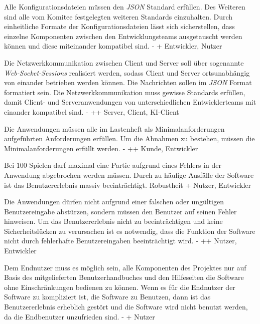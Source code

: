        {Alle Konfigurationsdateien müssen den \textit{JSON} Standard erfüllen. Des Weiteren sind alle vom Komitee festgelegten weiteren Standards einzuhalten.}
        {Durch einheitliche Formate der Konfigurationsdateien lässt sich sicherstellen, dass einzelne Komponenten zwischen den Entwicklungsteams ausgetauscht werden können und diese miteinander kompatibel sind. }
        {-}
        {+}
        {Entwickler, Nutzer}

        {Die Netzwerkkommunikation zwischen Client und Server soll über sogenannte \textit{Web-Socket-Sessions} realisiert werden, sodass Client und Server ortsunabhängig von einander betrieben werden können. Die Nachrichten sollen im \textit{JSON} Format formatiert sein.}
        {Die Netzwerkkommunikation muss gewisse Standards erfüllen, damit Client- und Serveranwendungen von unterschiedlichen Entwicklerteams mit einander kompatibel sind.}
        {-}
        {++}
        {Server, Client, KI-Client}

        {Die Anwendungen müssen alle im Lastenheft als Minimalanforderungen aufgeführten Anforderungen erfüllen.}
        {Um die Abnahmen zu bestehen, müssen die Minimalanforderungen erfüllt werden.}
        {-}
        {++}
        {Kunde, Entwickler}

        {Bei $100$ Spielen darf maximal eine Partie aufgrund eines Fehlers in der Anwendung abgebrochen werden müssen.}
        {Durch zu häufige Ausfälle der Software ist das Benutzererlebnis massiv beeinträchtigt.}
        {Robustheit}
        {+}
        {Nutzer, Entwickler}

        {Die Anwendungen dürfen nicht aufgrund einer falschen oder ungültigen Benutzereingabe abstürzen, sondern müssen den Benutzer auf seinen Fehler hinweisen.}
        {Um das Benutzererlebnis nicht zu beeinträchtigen und keine Sicherheitslücken zu verursachen ist es notwendig, dass die Funktion der Software nicht durch fehlerhafte Benutzereingaben beeinträchtigt wird.}
        {-}
        {++}
        {Nutzer, Entwickler}

        {Dem Endnutzer muss es möglich sein, alle Komponenten des Projektes nur auf Basis des mitgelieferten Benutzerhandbuches und den Hilfeseiten die Software ohne Einschränkungen bedienen zu können.}
        {Wenn es für die Endnutzer der Software zu kompliziert ist, die Software zu Benutzen, dann ist das Benutzererlebnis erheblich gestört und die Software wird nicht benutzt werden, da die Endbenutzer unzufrieden sind.}
        {-}
        {+}
        {Nutzer}
        
